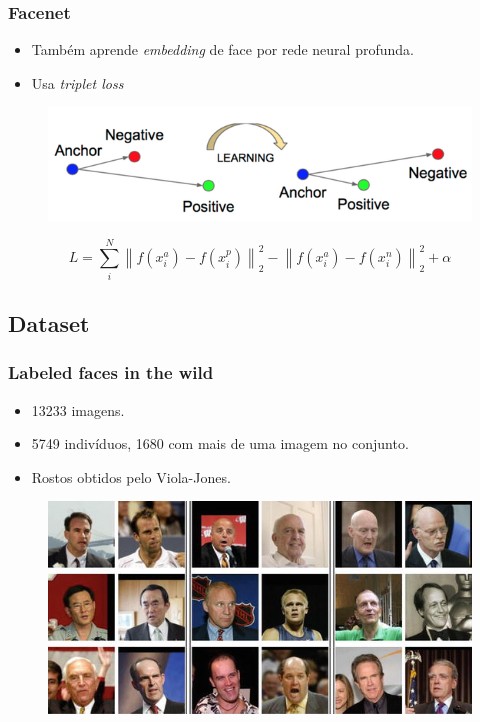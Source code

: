 \documentclass{beamer}
\newcommand{\norm}[1]{\left\lVert#1\right\rVert}
\begin{document}
\begin{frame}
\frametitle{Facenet~\cite{facenet}}
\begin{itemize}
    \item Também aprende \textit{embedding} de face por rede neural profunda.
    \item Usa \textit{triplet loss}
\end{itemize}
    \begin{figure}
    \includegraphics[width=0.75\linewidth]{figs/tripletLoss.png}
    \end{figure}
    \begin{equation}
        L=\sum_i^N\norm{f(x_i^a) - f(x_i^p)}_2^2 - \norm{f(x_i^a) - f(x_i^n)}_2^2 + \alpha
    \end{equation}
\end{frame}
\subsection{Dataset}
\begin{frame}
\frametitle{Labeled faces in the wild~\cite{lfw}}
    \begin{itemize}
        \item 13233 imagens.
        \item 5749 indivíduos, 1680 com mais de uma imagem no conjunto.
        \item Rostos obtidos pelo Viola-Jones.
    \end{itemize}
    \begin{figure}
    \includegraphics[width=0.75\linewidth]{figs/lfw.jpg}
    \end{figure}
\end{frame}
\end{document}
